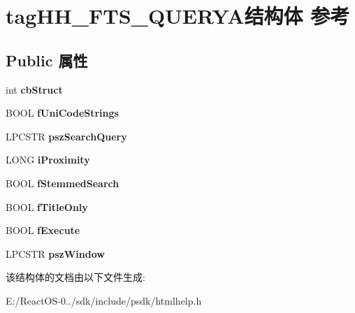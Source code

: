 \hypertarget{structtag_h_h___f_t_s___q_u_e_r_y_a}{}\section{tag\+H\+H\+\_\+\+F\+T\+S\+\_\+\+Q\+U\+E\+R\+Y\+A结构体 参考}
\label{structtag_h_h___f_t_s___q_u_e_r_y_a}
\subsection*{Public 属性}
\begin{DoxyCompactItemize}
\item 
\mbox{\label{structtag_h_h___f_t_s___q_u_e_r_y_a_a5f7882f4ba681078a988d976b4badc3f}} 
int {\bfseries cb\+Struct}
\item 
\mbox{\label{structtag_h_h___f_t_s___q_u_e_r_y_a_a5f3f54e241f60d176c8967063d5ed45b}} 
B\+O\+OL {\bfseries f\+Uni\+Code\+Strings}
\item 
\mbox{\label{structtag_h_h___f_t_s___q_u_e_r_y_a_ae5186cd1c6b8f56454d66faa31179692}} 
L\+P\+C\+S\+TR {\bfseries psz\+Search\+Query}
\item 
\mbox{\label{structtag_h_h___f_t_s___q_u_e_r_y_a_a080f69219c45baf9e7b424b17816c4ac}} 
L\+O\+NG {\bfseries i\+Proximity}
\item 
\mbox{\label{structtag_h_h___f_t_s___q_u_e_r_y_a_ad8adf6c235d0df3a271956e57b0b1ce9}} 
B\+O\+OL {\bfseries f\+Stemmed\+Search}
\item 
\mbox{\label{structtag_h_h___f_t_s___q_u_e_r_y_a_aaeceaf7155684e6381edf764ecb9f387}} 
B\+O\+OL {\bfseries f\+Title\+Only}
\item 
\mbox{\label{structtag_h_h___f_t_s___q_u_e_r_y_a_a4c2c400c78fa9c099bc7d94b7964cbcc}} 
B\+O\+OL {\bfseries f\+Execute}
\item 
\mbox{\label{structtag_h_h___f_t_s___q_u_e_r_y_a_a94394abeb57beae17e3f4b817b5becca}} 
L\+P\+C\+S\+TR {\bfseries psz\+Window}
\end{DoxyCompactItemize}


该结构体的文档由以下文件生成\+:\begin{DoxyCompactItemize}
\item 
E\+:/\+React\+O\+S-\/0../sdk/include/psdk/htmlhelp.\+h\end{DoxyCompactItemize}
